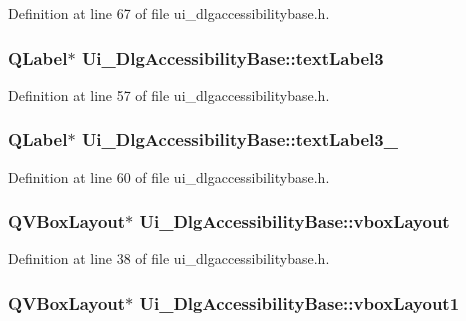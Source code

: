 Definition at line 67 of file ui\+\_\+dlgaccessibilitybase.\+h.

\hypertarget{classUi__DlgAccessibilityBase_ab4f97510e236d55ac92d0c0befc04068}{
\subsubsection[{text\+Label3}]{\setlength{\rightskip}{0pt plus 5cm}Q\+Label$\ast$ Ui\+\_\+\+Dlg\+Accessibility\+Base\+::text\+Label3}}\label{classUi__DlgAccessibilityBase_ab4f97510e236d55ac92d0c0befc04068}


Definition at line 57 of file ui\+\_\+dlgaccessibilitybase.\+h.

\hypertarget{classUi__DlgAccessibilityBase_a87a49764d21731bab617cdbe42f2b263}{
\subsubsection[{text\+Label3\+\_\+2}]{\setlength{\rightskip}{0pt plus 5cm}Q\+Label$\ast$ Ui\+\_\+\+Dlg\+Accessibility\+Base\+::text\+Label3\+\_}}\label{classUi__DlgAccessibilityBase_a87a49764d21731bab617cdbe42f2b263}


Definition at line 60 of file ui\+\_\+dlgaccessibilitybase.\+h.

\hypertarget{classUi__DlgAccessibilityBase_abb6e3109a50289ea7dd8791e43379d3e}{
\subsubsection[{vbox\+Layout}]{\setlength{\rightskip}{0pt plus 5cm}Q\+V\+Box\+Layout$\ast$ Ui\+\_\+\+Dlg\+Accessibility\+Base\+::vbox\+Layout}}\label{classUi__DlgAccessibilityBase_abb6e3109a50289ea7dd8791e43379d3e}


Definition at line 38 of file ui\+\_\+dlgaccessibilitybase.\+h.

\hypertarget{classUi__DlgAccessibilityBase_a83ac60339f9462b3a0571677794fae95}{
\subsubsection[{vbox\+Layout1}]{\setlength{\rightskip}{0pt plus 5cm}Q\+V\+Box\+Layout$\ast$ Ui\+\_\+\+Dlg\+Accessibility\+Base\+::vbox\+Layout1}}\label{classUi__DlgAccessibilityBase_a83ac60339f9462b3a0571677794fae95}


